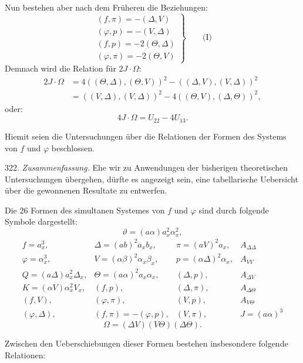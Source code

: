 \documentclass[11pt]{article}
\providecommand{\weberpage}[1]{}
\let\Delta\varDelta
\let\Theta\varTheta
\let\Omega\varOmega
\begin{document}
Nun bestehen aber nach dem Früheren die Beziehungen:
\[
\left.\begin{array}{l}
(f,\pi)=-(\Delta,V)\\
(\varphi,p)=-(V,\Delta)\\
(f,p)=-2(\Theta,\Delta)\\
(\varphi,\pi)=-2(\Theta,V)
\end{array}\right\}\qquad\text{(I)}
\]
Demnach wird die Relation für $2J\cdot\Omega$:
\[
\begin{aligned}
2J\cdot\Omega&=4((\Theta,\Delta),(\Theta,V))^2-((\Delta,V),(V,\Delta))^2\\
&=((V,\Delta),(V,\Delta))^2-4((\Theta,V),(\Delta,\Theta))^2,
\end{aligned}
\]
oder:
\[
4J\cdot\Omega=U_{22}-4U_{13}.
\]

Hiemit seien die Untersuchungen über die Relationen der Formen des
Systems von $f$ und $\varphi$ beschlossen.

322. \textit{Zusammenfassung.} Ehe wir zu Anwendungen der bisherigen
theoretischen Untersuchungen übergehen, dürfte es angezeigt sein, eine
tabellarische Uebersicht über die gewonnenen Resultate zu entwerfen.

Die 26 Formen des simultanen Systemes von $f$ und $\varphi$ sind durch
folgende Symbole dargestellt:
\[
\vartheta=(a\alpha)a_x^2\alpha_x^2,
\]
\[
\begin{array}{llll}
f=a_x^3, & \Delta=(ab)^2a_xb_x, & \pi=(aV)^2a_x, & A_{\Delta\Delta}\\
\varphi=\alpha_x^3, & V=(\alpha\beta)^2\alpha_x\beta_x, & p=(\alpha\Delta)^2\alpha_x, & A_{VV}\\
Q=(a\Delta)a_x^2\Delta_x, & \Theta=(a\alpha)^2a_x\alpha_x, & (\Delta,p), & A_{\Delta V}\\
K=(\alpha V)\alpha_x^2V_x, & (f,p), & (\Delta,\pi), & A_{\Delta\Theta}\\
(f,V), & (\varphi,\pi), & (V,p), & A_{V\Theta}\\
(\varphi,\Delta), & (f,\pi)=-(\varphi,p), & (V,\pi), & J=(a\alpha)^3
\end{array}
\]
\[
\Omega=(\Delta V)(V\Theta)(\Delta\Theta).
\]

Zwischen den Ueberschiebungen dieser Formen bestehen insbesondere
folgende Relationen:


\weberpage{346}
\end{document}
